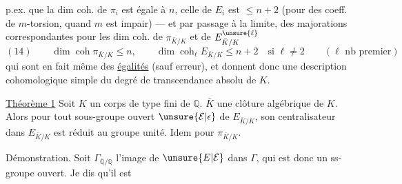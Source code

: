 p.ex. que la dim coh. de $\pi_i$ est égale à $n$, celle de $E_i$ est $\leq n+2$ (pour des coeff.  de $m$-torsion, quand $m$ est impair) --- et par passage à la limite, des majorations correspondantes pour les dim coh. de $\pi_{\bar K/K}$ et de $E_{\bar K/K}^{\unsure{\ell}}$
\[
(14)\qquad \dim\operatorname{coh}\pi_{\bar K/K}\leq n,\qquad
\dim\operatorname{coh}_{\ell}E_{\bar K/K}\leq n+2\quad\text{si }\ell\neq2
\qquad(\ell\text{ nb premier})
\]
qui sont en fait même des \uline{égalités} (sauf erreur), et donnent donc une description cohomologique simple du degré de transcendance absolu de $K$.

\uline{Théorème 1} Soit $K$ un corps  de type fini de $\mathbb Q$.  $\bar K$ une clôture algébrique de $K$. Alors pour tout sous-groupe ouvert $\unsure{\mathcal E|\epsilon}$ de $E_{\bar K/K}$, son centralisateur dans $E_{\bar K/K}$ est réduit au groupe unité. Idem pour $\pi_{\bar K/K}$.

Démonstration. Soit $\Gamma_{\overline{\mathbb Q}/\mathbb Q}$ l'image de $\unsure{E|\mathcal E}$ dans $\Gamma$, qui est donc un ss-groupe ouvert.   Je dis qu'il est
